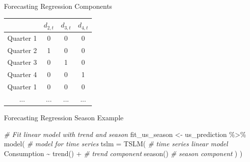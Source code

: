 \documentclass[
  ignorenonframetext,
]{beamer}
\newenvironment{Shaded}{\begin{snugshade}}{\end{snugshade}}
\newcommand{\AttributeTok}[1]{\textcolor[rgb]{0.77,0.63,0.00}{#1}}
\newcommand{\CommentTok}[1]{\textcolor[rgb]{0.56,0.35,0.01}{\textit{#1}}}
\newcommand{\FunctionTok}[1]{\textcolor[rgb]{0.00,0.00,0.00}{#1}}
\newcommand{\NormalTok}[1]{#1}
\newcommand{\OtherTok}[1]{\textcolor[rgb]{0.56,0.35,0.01}{#1}}
\newcommand{\SpecialCharTok}[1]{\textcolor[rgb]{0.00,0.00,0.00}{#1}}
\begin{document}
\begin{frame}{Forecasting \textbar{} \small Regression Components}
\begin{table}
\begin{tabular}{c c c c}
\toprule

 & \(\displaystyle d_{2,t} \) & \(\displaystyle d_{3,t} \) & \(\displaystyle d_{4,t} \) \\ \midrule

Quarter 1 & 0 & 0 & 0 \\

Quarter 2 & 1 & 0 & 0 \\

Quarter 3 & 0 & 1 & 0 \\

Quarter 4 & 0 & 0 & 1 \\

Quarter 1 & 0 & 0 & 0 \\

... & ... & ... & ... \\

\bottomrule

\end{tabular}
\end{table}
\end{frame}

\begin{frame}[fragile]{Forecasting \textbar{} \small Regression Season
Example}
\protect\hypertarget{forecasting-regression-season-example}{}
\footnotesize

\begin{Shaded}
\begin{Highlighting}[]
\CommentTok{\# Fit linear model with trend and season}
\NormalTok{fit\_us\_season }\OtherTok{\textless{}{-}}\NormalTok{ us\_prediction }\SpecialCharTok{\%\textgreater{}\%}
  \FunctionTok{model}\NormalTok{( }\CommentTok{\# model for time series}
    \AttributeTok{tslm =} \FunctionTok{TSLM}\NormalTok{( }\CommentTok{\# time series linear model}
\NormalTok{      Consumption }\SpecialCharTok{\textasciitilde{}} \FunctionTok{trend}\NormalTok{() }\SpecialCharTok{+} \CommentTok{\# trend component}
        \FunctionTok{season}\NormalTok{() }\CommentTok{\# season component}
\NormalTok{    )}
\NormalTok{  )}
\end{Highlighting}
\end{Shaded}

\normalfont
\end{frame}
\end{document}
